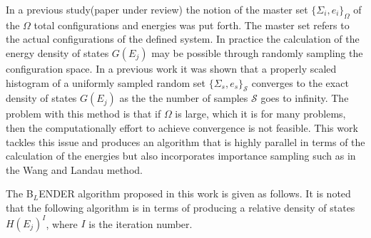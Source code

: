 \documentclass[aps,prl,reprint,superscriptaddress,showkeys]{revtex4-1}
\begin{document}
  In a previous study(paper under review) the notion of the master set $\{ \Sigma_i, e_i \}_\Omega $ of the $\Omega$ total configurations and energies was put forth. The master set refers to the actual configurations of the defined system. In practice the calculation of the energy density of states $G(E_j)$  may  be possible through randomly sampling the configuration space.  In a previous work it was shown that a properly scaled histogram of a uniformly sampled random set $\{ \Sigma_s, e_s \}_\mathcal{S}$ converges to the exact density of states $G(E_j)$ as the the number of samples $\mathcal{S}$ goes to infinity. The problem with this method is that if $\Omega$ is large, which it is for many problems,  then the computationally effort to achieve convergence is not feasible.  This work tackles this issue and produces an algorithm that is highly parallel in terms of the calculation of the energies  but also incorporates importance sampling such as in the Wang and Landau method.
   
The B$_{L}$ENDER algorithm proposed in this work  is given as follows. It is noted that the following algorithm is in terms of producing a relative density of states $H(E_j)^I$, where $I$ is the iteration number. 
\end{document}
